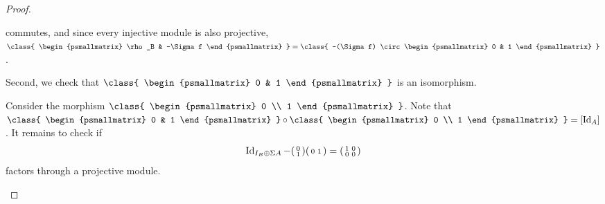 \begin{proof}
\begin{enumerate}[label={(\bfseries TR\arabic*)}]
{\begin{center}
            \end{center}
            commutes, and since every injective module is also projective, \(\class{
                    \begin{psmallmatrix}
                        \rho_B & -\Sigma f
                    \end{psmallmatrix}
                }
                =
                \class{
                    -(\Sigma f) \circ
                    \begin{psmallmatrix}
                        0 & 1
                    \end{psmallmatrix}
                }
            \).

            Second, we check that \( \class{
                \begin{psmallmatrix}
                    0 & 1
                \end{psmallmatrix}
            } \) is an isomorphism.

            Consider the morphism \( \class{
                \begin{psmallmatrix}
                    0 \\
                    1
                \end{psmallmatrix}
            } \).
            Note that \( \class{
                \begin{psmallmatrix}
                    0 & 1
                \end{psmallmatrix}
            } \circ \class{
                \begin{psmallmatrix}
                    0 \\
                    1
                \end{psmallmatrix}
            } = [\Id_A] \).
            It remains to check if
            \[
                \operatorname{Id}_{I_B \oplus \Sigma A} -
                \begin{psmallmatrix}
                    0 \\
                    1
                \end{psmallmatrix}
                \begin{psmallmatrix}
                    0 & 1
                \end{psmallmatrix}
                =
                \begin{psmallmatrix}
                    1 & 0 \\
                    0 & 0
                \end{psmallmatrix}
            \]
            factors through a projective module.

}
\end{enumerate}
\end{proof}

